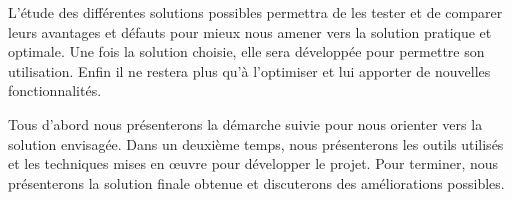 

L'étude des différentes solutions possibles permettra de les tester et de comparer leurs avantages et défauts pour mieux nous amener vers la solution pratique et optimale.
Une fois la solution choisie, elle sera développée pour permettre son utilisation.
Enfin il ne restera plus qu'à l'optimiser et lui apporter de nouvelles fonctionnalités.


Tous d'abord nous présenterons la démarche suivie pour nous orienter vers la solution envisagée.
Dans un deuxième temps, nous présenterons les outils utilisés et les techniques mises en œuvre pour développer le projet.
Pour terminer, nous présenterons la solution finale obtenue et discuterons des améliorations possibles.
\\
